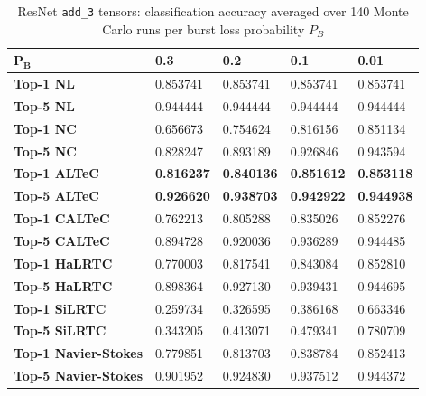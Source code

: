 \documentclass[conference,letterpaper]{IEEEtran}
\begin{document}
\begin{table}[t]
\caption{ResNet \texttt{add\_3} tensors: classification accuracy averaged over 140 Monte Carlo runs per burst loss probability $P_B$}
\label{table:resnet18add3}
\begin{tabular}{|l|llll|}
\hline
$\mathbf{P_B}$                & \textbf{0.3}      & \textbf{0.2}      & \textbf{0.1}      & \textbf{0.01}               \\
\hline
\textbf{Top-1 NL}            & 0.853741 & 0.853741 & 0.853741 & 0.853741           \\
\textbf{Top-5 NL}            & 0.944444 & 0.944444 & 0.944444 & 0.944444           \\
\hline
\textbf{Top-1 NC}            & 0.656673 & 0.754624 & 0.816156 & 0.851134           \\
\textbf{Top-5 NC}            & 0.828247 & 0.893189 & 0.926846 & 0.943594           \\
\hline
\textbf{Top-1 ALTeC}         & \textbf{0.816237} & \textbf{0.840136} & \textbf{0.851612} & \textbf{0.853118}           \\
\textbf{Top-5 ALTeC}         & \textbf{0.926620} & \textbf{0.938703} & \textbf{0.942922} & \textbf{0.944938}           \\
\hline
\textbf{Top-1 CALTeC}        & 0.762213 & 0.805288 & 0.835026 & 0.852276           \\
\textbf{Top-5 CALTeC}        & 0.894728 & 0.920036 & 0.936289 & 0.944485           \\
\hline
\textbf{Top-1 HaLRTC}        & 0.770003 & 0.817541 & 0.843084 & 0.852810           \\
\textbf{Top-5 HaLRTC}        & 0.898364 & 0.927130 & 0.939431 & 0.944695           \\
\hline
\textbf{Top-1 SiLRTC}        & 0.259734 & 0.326595 & 0.386168 & 0.663346           \\
\textbf{Top-5 SiLRTC}        & 0.343205 & 0.413071 & 0.479341 & 0.780709           \\
\hline
\textbf{Top-1 Navier-Stokes} & 0.779851 & 0.813703 & 0.838784 & 0.852413           \\
\textbf{Top-5 Navier-Stokes} & 0.901952 & 0.924830 & 0.937512 & 0.944372 \\
\hline
\end{tabular}
\end{table}
\end{document}
